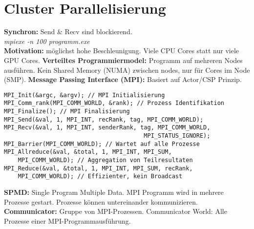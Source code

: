 \section{Cluster Parallelisierung}
\textbf{Synchron:} Send \& Recv sind blockierend.\\ 
\textit{mpiexe -n 100 programm.exe}\\
\textbf{Motivation:} möglichst hohe Beschleunigung. Viele CPU Cores statt nur viele GPU Cores.
\textbf{Verteiltes Programmiermodel:} Programm auf mehreren Nodes ausführen. Kein Shared Memory (NUMA) zwischen nodes, nur für Cores im Node (SMP).
\textbf{Message Passing Interface (MPI):} Basiert auf Actor/CSP Prinzip.
\begin{lstlisting}
MPI_Init(&argc, &argv); // MPI Initialisierung 
MPI_Comm_rank(MPI_COMM_WORLD, &rank); // Prozess Identifikation
MPI_Finalize(); // MPI Finalisierung
MPI_Send(&val, 1, MPI_INT, recRank, tag, MPI_COMM_WORLD);
MPI_Recv(&val, 1, MPI_INT, senderRank, tag, MPI_COMM_WORLD, 
                                        MPI_STATUS_IGNORE);
MPI_Barrier(MPI_COMM_WORLD); // Wartet auf alle Prozesse
MPI_Allreduce(&val, &total, 1, MPI_INT, MPI_SUM, 
    MPI_COMM_WORLD); // Aggregation von Teilresultaten
MPI_Reduce(&val, &total, 1, MPI_INT, MPI_SUM, recRank, 
    MPI_COMM_WORLD); // Effizienter, kein Broadcast
\end{lstlisting}
\textbf{SPMD:} Single Program Multiple Data. MPI Programm wird in mehrere Prozesse gestart.
Prozesse können untereinander kommunizieren.
\textbf{Communicator:} Gruppe von MPI-Prozessen. 
Communicator World: Alle Prozesse einer MPI-Programmausführung.